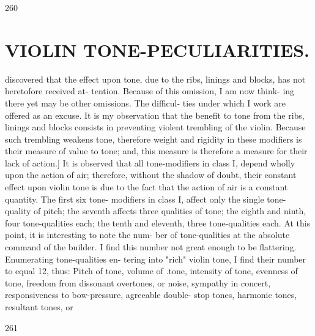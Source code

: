 \documentclass{article}
\begin{document}
260

\section*{VIOLIN TONE-PECULIARITIES.}
discovered that the effect upon tone, due to the ribs, linings and blocks, has not heretofore received at- tention. Because of this omission, I am now think- ing there yet may be other omissions. The difficul- ties under which I work are offered as an excuse. It is my observation that the benefit to tone from the ribs, linings and blocks consists in preventing violent trembling of the violin. Because such trembling weakens tone, therefore weight and rigidity in these modifiers is their measure of value to tone; and, this measure is therefore a measure for their lack of action.] It is observed that all tone-modifiers in class I, depend wholly upon the action of air; therefore, without the shadow of doubt, their constant effect upon violin tone is due to the fact that the action of air is a constant quantity. The first six tone- modifiers in class I, affect only the single tone- quality of pitch; the seventh affects three qualities of tone; the eighth and ninth, four tone-qualities each; the tenth and eleventh, three tone-qualities each. At this point, it is interesting to note the num- ber of tone-qualities at the absolute command of the builder. I find this number not great enough to be flattering. Enumerating tone-qualities en- tering into "rich" violin tone, I find their number to equal 12, thus: Pitch of tone, volume of .tone, intensity of tone, evenness of tone, freedom from dissonant overtones, or noise, sympathy in concert, responsiveness to bow-pressure, agreeable double- stop tones, harmonic tones, resultant tones, or

261
\end{document}
